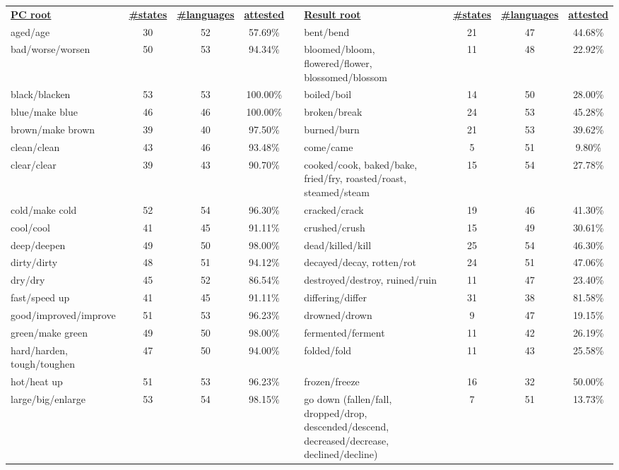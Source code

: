 \begin{tabular}{p{3cm}ccccp{3cm}ccc}
\underline{\textbf{PC root}} & \underline{\textbf{\#states}} & \underline{\textbf{\#languages}} & \underline{\textbf{attested}} & & \underline{\textbf{Result root}} & \underline{\textbf{\#states}} & \underline{\textbf{\#languages}} & \underline{\textbf{attested}} \\
aged/age & 30 & 52 & 57.69\% & & bent/bend & 21 & 47 & 44.68\% \\
bad/worse/worsen & 50 & 53 & 94.34\% & & bloomed/bloom, flowered/flower, blossomed/blossom & 11 & 48 & 22.92\% \\
black/blacken & 53 & 53 & 100.00\% & & boiled/boil & 14 & 50 & 28.00\% \\
blue/make blue & 46 & 46 & 100.00\% & & broken/break & 24 & 53 & 45.28\% \\
brown/make brown & 39 & 40 & 97.50\% & & burned/burn & 21 & 53 & 39.62\% \\
clean/clean & 43 & 46 & 93.48\% & & come/came & 5 & 51 & 9.80\% \\
clear/clear & 39 & 43 & 90.70\% & & cooked/cook, baked/bake, fried/fry, roasted/roast, steamed/steam & 15 & 54 & 27.78\% \\
cold/make cold & 52 & 54 & 96.30\% & & cracked/crack & 19 & 46 & 41.30\% \\
cool/cool & 41 & 45 & 91.11\% & & crushed/crush & 15 & 49 & 30.61\% \\
deep/deepen & 49 & 50 & 98.00\% & & dead/killed/kill & 25 & 54 & 46.30\% \\
dirty/dirty & 48 & 51 & 94.12\% & & decayed/decay, rotten/rot & 24 & 51 & 47.06\% \\
dry/dry & 45 & 52 & 86.54\% & & destroyed/destroy, ruined/ruin & 11 & 47 & 23.40\% \\
fast/speed up & 41 & 45 & 91.11\% & & differing/differ & 31 & 38 & 81.58\% \\
good/improved/improve & 51 & 53 & 96.23\% & & drowned/drown & 9 & 47 & 19.15\% \\
green/make green & 49 & 50 & 98.00\% & & fermented/ferment & 11 & 42 & 26.19\% \\
hard/harden, tough/toughen & 47 & 50 & 94.00\% & & folded/fold & 11 & 43 & 25.58\% \\
hot/heat up & 51 & 53 & 96.23\% & & frozen/freeze & 16 & 32 & 50.00\% \\
large/big/enlarge & 53 & 54 & 98.15\% & & go down (fallen/fall, dropped/drop, descended/descend, decreased/decrease, declined/decline) & 7 & 51 & 13.73\% \\

\end{tabular}
